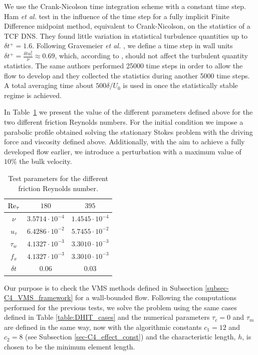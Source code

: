 We use the Crank-Nicolson time integration scheme with a constant time step. Ham \emph{et al.}  test in \cite{ham_fully_2002} the influence of the time step for a fully implicit Finite Difference midpoint method, equivalent to Crank-Nicolson, on the statistics of a TCF DNS. They found little variation in statistical turbulence quantities up to $\delta t^+=1.6$. Following Gravemeier \emph{et al.} \cite{gravemeier_algebraic_2010}, we define a time step in wall units $\delta t^+=\frac{\delta tu_\tau^2}{\nu}\approx0.69$, which, according to \cite{ham_fully_2002}, should not affect the turbulent quantity statistics. The same authors performed 25000 time steps in order to allow the flow to develop and they collected the statistics during another 5000 time steps. A total averaging time about $500\delta/U_0$ is used in \cite{choi_effects_1994} once the statistically stable regime is achieved.

In Table~\ref{table:Channel_parameters} we present the value of the different parameters defined above for the two different friction Reynolds numbers. For the initial condition we impose a parabolic profile obtained solving the stationary Stokes problem with the driving force and viscosity defined above. Additionally, with the aim to achieve a fully developed flow earlier, we introduce a perturbation with a maximum value of $10\%$ the bulk velocity.

\begin{table}[h!]
\centering
\begin{tabular}{ccc}
\hline
${\rm Re}_\tau$&$180$&$395$\\
\hline
$\nu$&$3.5714\cdot10^{-4}$&$1.4545\cdot10^{-4}$\\
$u_\tau$&$6.4286\cdot10^{-2}$&$5.7455\cdot10^{-2}$\\
$\tau_w$&$4.1327\cdot10^{-3}$&$3.3010\cdot10^{-3}$\\
$f_x$&$4.1327\cdot10^{-3}$&$3.3010\cdot10^{-3}$\\
$\delta t$&$0.06$&$0.03$\\
\hline
\end{tabular}
\caption{Test parameters for the different friction Reynolds number.}
\label{table:Channel_parameters}
\end{table}

Our purpose is to check the VMS methods defined in Subsection \ref{subsec-C4_VMS_framework} for a wall-bounded flow. Following the computations performed for the previous tests, we solve the problem using the same cases defined in Table \ref{table:DHIT_cases} and the numerical parameters $\tau_c=0$ and $\tau_m$ are defined in the same way, now with the algorithmic constants  $c_1=12$ and $c_2=8$ (see Subsection \ref{sec-C4_effect_const}) and the characteristic length, $h$, is chosen to be the minimum element length. 

